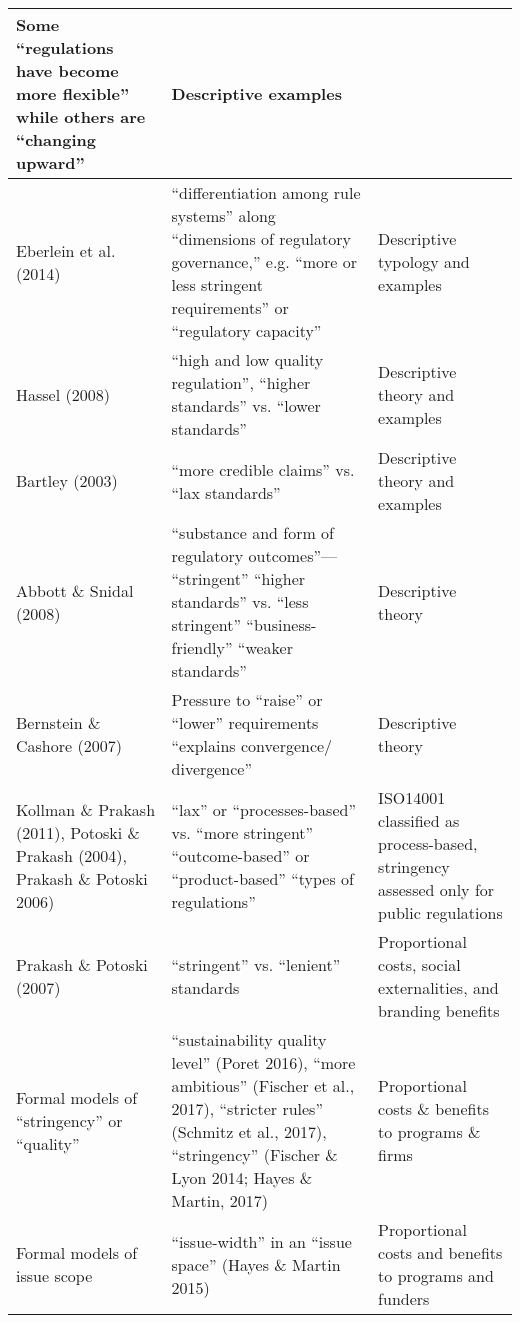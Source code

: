\begin{table}
\begin{tabular}{p{3.7cm}p{7.5cm}p{5cm}}
Some “regulations have become more flexible” while others are “changing upward”&
Descriptive examples\\
\hline
Eberlein et al. (2014)&
“differentiation among rule systems” along “dimensions of regulatory governance,” e.g. “more or less stringent requirements” or “regulatory capacity”&
Descriptive typology and examples\\
\hline
Hassel (2008)&
“high and low quality regulation”, “higher standards” vs. “lower standards”&
Descriptive theory and examples\\
\hline
Bartley (2003)&
“more credible claims” vs. “lax standards” &
Descriptive theory and examples\\
\hline
Abbott \& Snidal (2008)&
“substance and form of regulatory outcomes”—
 “stringent” “higher standards” vs. “less stringent” “business-friendly” “weaker standards”&
Descriptive theory\\
\hline
Bernstein \& Cashore (2007)&
Pressure to “raise” or “lower” requirements “explains convergence/ divergence”&
Descriptive theory\\
\hline
Kollman \& Prakash (2011), Potoski \& Prakash (2004), Prakash \& Potoski 2006)&
“lax” or “processes-based” vs. “more stringent” “outcome-based” or “product-based” “types of regulations”&
ISO14001 classified as process-based, stringency assessed only for public regulations\\
\hline
Prakash \& Potoski (2007)&
“stringent” vs. “lenient” standards&
Proportional costs, social externalities, and branding benefits\\
\hline
Formal models of “stringency” or “quality”&
“sustainability quality level” (Poret 2016), “more ambitious” (Fischer et al., 2017), “stricter rules” (Schmitz et al., 2017), “stringency” (Fischer \& Lyon 2014; Hayes \& Martin, 2017)&
Proportional costs \& benefits to programs \& firms\\
\hline
Formal models of issue scope&
“issue-width” in an “issue space” (Hayes \& Martin 2015)&
Proportional costs and benefits to programs and funders
\end{tabular}

\end{table}
